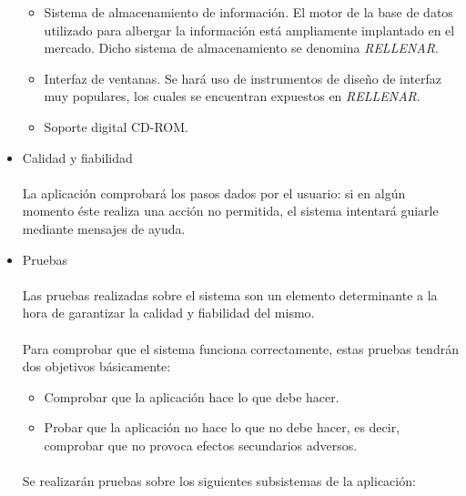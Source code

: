 \begin{itemize}
   \begin{itemize}
      \item Sistema de almacenamiento de información. El motor de la base de
      datos utilizado para albergar la información está ampliamente implantado
      en el mercado. Dicho sistema de almacenamiento se denomina
      \textit{RELLENAR}.
      \item Interfaz de ventanas. Se hará uso de instrumentos de diseño de
      interfaz muy populares, los cuales se encuentran expuestos en
      \textit{RELLENAR}.
      \item Soporte digital CD-ROM.
   \end{itemize}


 \item Calidad y fiabilidad

   \paragraph{}La aplicación comprobará los pasos dados por el usuario: si en
   algún momento éste realiza una acción no permitida, el sistema intentará
   guiarle mediante mensajes de ayuda.

 \item Pruebas

   \paragraph{}Las pruebas realizadas sobre el sistema son un elemento
   determinante a la hora de garantizar la calidad y fiabilidad del mismo.

   \paragraph{}Para comprobar que el sistema funciona correctamente, estas
   pruebas tendrán dos objetivos básicamente:

   \begin{itemize}
      \item Comprobar que la aplicación hace lo que debe hacer.
      \item Probar que la aplicación no hace lo que no debe hacer, es decir,
      comprobar que no provoca efectos secundarios adversos.
   \end{itemize}

   \paragraph{}Se realizarán pruebas sobre los siguientes subsistemas de la
   aplicación:


\end{itemize}
